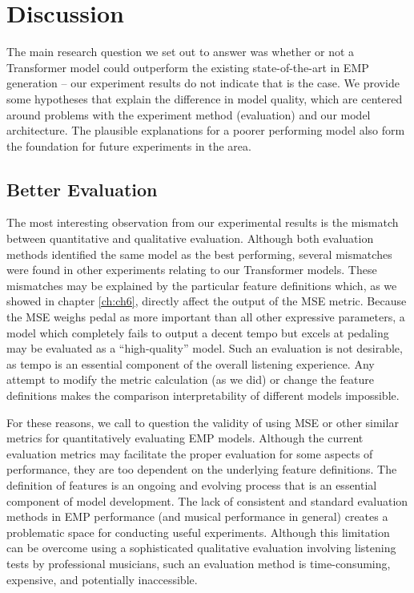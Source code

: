 \chapter{Discussion} \label{ch:ch7}
The main research question we set out to answer was whether or not a Transformer model could outperform the existing state-of-the-art in EMP generation -- our experiment results do not indicate that is the case. We provide some hypotheses that explain the difference in model quality, which are centered around problems with the experiment method (evaluation) and our model architecture. The plausible explanations for a poorer performing model also form the foundation for future experiments in the area.

\section{Better Evaluation}
The most interesting observation from our experimental results is the mismatch between quantitative and qualitative evaluation. Although both evaluation methods identified the same model as the best performing, several mismatches were found in other experiments relating to our Transformer models. These mismatches may be explained by the particular \vnetf{} feature definitions which, as we showed in chapter \ref{ch:ch6}, directly affect the output of the MSE metric. Because the \vnetf{} MSE weighs pedal as more important than all other expressive parameters, a model which completely fails to output a decent tempo but excels at pedaling may be evaluated as a ``high-quality'' model. Such an evaluation is not desirable, as tempo is an essential component of the overall listening experience. Any attempt to modify the metric calculation (as we did) or change the feature definitions makes the comparison interpretability of different models impossible. 

For these reasons, we call to question the validity of using MSE or other similar metrics for quantitatively evaluating EMP models. Although the current evaluation metrics may facilitate the proper evaluation for some aspects of performance, they are too dependent on the underlying feature definitions. The definition of features is an ongoing and evolving process that is an essential component of model development. The lack of consistent and standard evaluation methods in EMP performance (and musical performance in general) creates a problematic space for conducting useful experiments. Although this limitation can be overcome using a sophisticated qualitative evaluation involving listening tests by professional musicians, such an evaluation method is time-consuming, expensive, and potentially inaccessible. 


